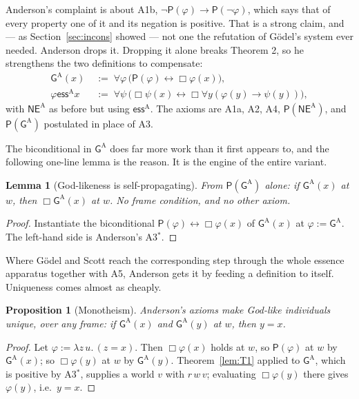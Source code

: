 \documentclass[11pt]{article}
\theoremstyle{plain}
\newtheorem{lemma}[theorem]{Lemma}
\newtheorem{proposition}[theorem]{Proposition}
\theoremstyle{definition}
\newcommand{\ess}{\mathrel{\mathsf{ess}}}
\newcommand{\NE}{\mathsf{NE}}
\newcommand{\Gd}{\mathsf{G}}
\newcommand{\Pos}{\mathsf{P}}
\begin{document}
Anderson's complaint is about A1b, $\neg\Pos(\varphi) \to \Pos(\neg\varphi)$,
which says that of every property one of it and its negation is positive. That
is a strong claim, and --- as Section~\ref{sec:incons} showed --- not one the
refutation of G\"odel's system ever needed. Anderson drops it. Dropping it
alone breaks Theorem 2, so he strengthens the two definitions to compensate:
\begin{align*}
  \Gd^{\mathrm{A}}(x) &\;:=\; \forall\varphi\,\bigl(\Pos(\varphi) \leftrightarrow \Box\varphi(x)\bigr), \\
  \varphi \ess^{\mathrm{A}} x &\;:=\; \forall\psi\,\bigl(\Box\psi(x) \leftrightarrow \Box\forall y(\varphi(y)\to\psi(y))\bigr),
\end{align*}
with $\NE^{\mathrm{A}}$ as before but using $\ess^{\mathrm{A}}$. The axioms are
A1a, A2, A4, $\Pos(\NE^{\mathrm{A}})$, and $\Pos(\Gd^{\mathrm{A}})$ postulated
in place of A3.

The biconditional in $\Gd^{\mathrm{A}}$ does far more work than it first
appears to, and the following one-line lemma is the reason. It is the engine of
the entire variant.

\begin{lemma}[God-likeness is self-propagating]\label{lem:andboxgod}
From $\Pos(\Gd^{\mathrm{A}})$ alone: if $\Gd^{\mathrm{A}}(x)$ at $w$, then
$\Box\Gd^{\mathrm{A}}(x)$ at $w$. No frame condition, and no other axiom.
\end{lemma}

\begin{proof}
Instantiate the biconditional $\Pos(\varphi) \leftrightarrow \Box\varphi(x)$ of
$\Gd^{\mathrm{A}}(x)$ at $\varphi := \Gd^{\mathrm{A}}$. The left-hand side is
Anderson's A3$^{*}$.
\end{proof}

\noindent
Where G\"odel and Scott reach the corresponding step through the whole essence
apparatus together with A5, Anderson gets it by feeding a definition to itself.
Uniqueness comes almost as cheaply.

\begin{proposition}[Monotheism]\label{prop:mono}
Anderson's axioms make God-like individuals unique, over \emph{any} frame: if
$\Gd^{\mathrm{A}}(x)$ and $\Gd^{\mathrm{A}}(y)$ at $w$, then $y = x$.
\end{proposition}

\begin{proof}
Let $\varphi := \lambda z\,u.\,(z = x)$. Then $\Box\varphi(x)$ holds at $w$, so
$\Pos(\varphi)$ at $w$ by $\Gd^{\mathrm{A}}(x)$; so $\Box\varphi(y)$ at $w$ by
$\Gd^{\mathrm{A}}(y)$. Theorem~\ref{lem:T1} applied to $\Gd^{\mathrm{A}}$,
which is positive by A3$^{*}$, supplies a world $v$ with $r\,w\,v$; evaluating
$\Box\varphi(y)$ there gives $\varphi(y)$, i.e.\ $y = x$.
\end{proof}
\end{document}
